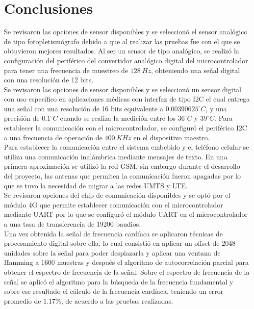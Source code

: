 
\section{Conclusiones}

Se revisaron las opciones de sensor disponibles y se seleccionó el sensor analógico de tipo fotopletismógrafo debido a que al realizar las pruebas fue con el que se obtuvieron mejores resultados. Al ser un sensor de tipo analógico, se realizó la configuración del periférico del convertidor analógico digital del microcontrolador para tener una frecuencia de muestreo de $128\ Hz$, obteniendo una señal digital con una resolución de 12 bits.\\

Se revisaron las opciones de sensor disponibles y se seleccionó un sensor digital con uso específico en aplicaciones médicas con interfaz de tipo I2C el cual entrega una señal con una resolución de 16 bits equivalente a $0.00390625^{\circ}C$, y una precisión de $0.1^{\circ}C$ cuando se realiza la medición entre los $36^{\circ}C$ y $39^{\circ}C$. Para establecer la comunicación con el microcontrolador, se configuró el periférico I2C a una frecuencia de operación de $400\ KHz$ en el dispositivo maestro. \\

Para establecer la comunicación entre el sistema embebido y el teléfono celular se utiliza una comunicación inalámbrica mediante mensajes de texto. En una primera aproximación se utilizó la red GSM, sin embargo durante el desarrollo del proyecto, las antenas que permiten la comunicación fueron apagadas por lo que se tuvo la necesidad de migrar a las redes UMTS y LTE.\\

Se revisaron opciones del chip de comunicación disponibles y se optó por el módulo 4G que permite establecer comunicación con el microcontrolador mediante UART por lo que se configuró el módulo UART en el microcontrolador a una tasa de transferencia de 19200 baudios.\\

Una vez obtenida la señal de frecuencia cardíaca se aplicaron técnicas de procesamiento digital sobre ella, lo cual consistió en aplicar un offset de 2048 unidades sobre la señal para poder desplazarla y aplicar una ventana de Hamming a 1600 muestras y después el algoritmo de autocorrelación parcial para obtener el espectro de frecuencia de la señal. Sobre el espectro de frecuencia de la señal se aplicó el algoritmo para la búsqueda de la frecuencia fundamental y sobre ese resultado el cálculo de la frecuencia cardíaca, teniendo un error promedio de 1.17\%, de acuerdo a las pruebas realizadas.\\

